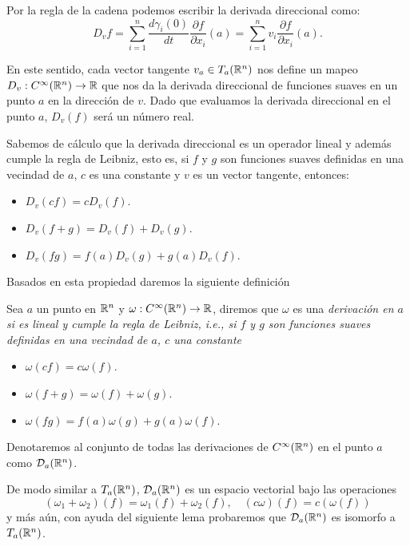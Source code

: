 Por la regla de la cadena podemos escribir la derivada direccional como:
\[
	D_v f
	= \sum_{i=1}^{n} \frac{d \gamma_i(0)}{dt} \frac{\partial f}{\partial x_i} (a)
	= \sum_{i=1}^n v_i \frac{\partial f}{\partial x_i} (a).
\]

En este sentido, cada vector tangente $v_a \in T_a(\mathbb{R}^n)$ nos define un mapeo $D_v: C^{\infty}(\mathbb{R}^n) \to \mathbb{R}$ que nos da la derivada direccional de funciones suaves en un punto $a$ en la dirección de $v$. Dado que evaluamos la derivada direccional en el punto $a$, $D_v(f)$ será un número real.

Sabemos de cálculo que la derivada direccional es un operador lineal y además cumple la regla de Leibniz, esto es, si $f$ y $g$ son funciones suaves definidas en una vecindad de $a$, $c$ es una constante y $v$ es un vector tangente, entonces:

\begin{itemize}
	\item $D_v(cf) = c D_v(f)$.
	\item $D_v(f+g) = D_v(f) + D_v(g)$.
	\item $D_v(fg) = f(a) D_v(g) + g(a) D_v(f)$.
\end{itemize}

Basados en esta propiedad daremos la siguiente definición

\begin{definition}\label{Definición: Derivación en un punto de Rn}
	Sea $a$ un punto en $\mathbb{R}^n$ y $\omega: C^{\infty}(\mathbb{R}^n) \to \mathbb{R}$, diremos que $\omega$ es una \it{derivación en $a$} si es lineal y cumple la regla de Leibniz, i.e., si $f$ y $g$ son funciones suaves definidas en una vecindad de $a$, $c$ una constante
	\begin{itemize}
		\item $\omega(cf) = c \omega(f)$.
		\item $\omega(f+g) = \omega(f) + \omega(g)$.
		\item $\omega(fg) = f(a) \omega(g) + g(a) \omega(f)$.
	\end{itemize}
	Denotaremos al conjunto de todas las derivaciones de $C^{\infty}(\mathbb{R}^n)$ en el punto $a$ como $\mathcal{D}_a(\mathbb{R}^n)$.
\end{definition}

De modo similar a $T_a(\mathbb{R}^n)$, $\mathcal{D}_a(\mathbb{R}^n)$ es un espacio vectorial bajo las operaciones
\[ (\omega_1 + \omega_2)(f) = \omega_1(f) + \omega_2(f), \quad (c\omega)(f) = c(\omega(f)) \]
y más aún, con ayuda del siguiente lema probaremos que $\mathcal{D}_a(\mathbb{R}^n)$ es isomorfo a $T_a(\mathbb{R}^n)$.

